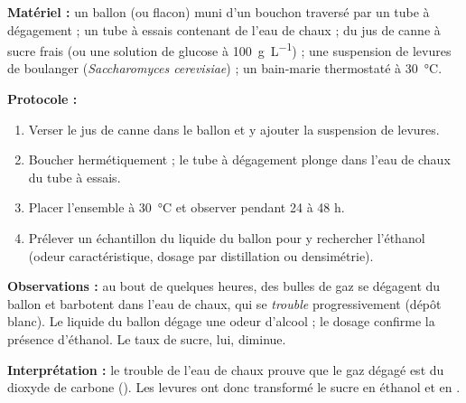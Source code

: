 \documentclass[11pt]{article}
\newcommand{\cle}[1]{{\popxbold\color{popdark}#1}}
\begin{document}
\begin{experience}
\textbf{Matériel :} un ballon (ou flacon) muni d'un bouchon traversé par un tube à dégagement ; un tube à essais contenant de l'eau de chaux ; du jus de canne à sucre frais (ou une solution de glucose à \SI{100}{\gram\per\liter}) ; une suspension de levures de boulanger (\emph{Saccharomyces cerevisiae}) ; un bain-marie thermostaté à \SI{30}{\celsius}.

\textbf{Protocole :}
\begin{enumerate}
\item Verser le jus de canne dans le ballon et y ajouter la suspension de levures.
\item Boucher hermétiquement ; le tube à dégagement plonge dans l'eau de chaux du tube à essais.
\item Placer l'ensemble à \SI{30}{\celsius} et observer pendant 24 à 48 h.
\item Prélever un échantillon du liquide du ballon pour y rechercher l'éthanol (odeur caractéristique, dosage par distillation ou densimétrie).
\end{enumerate}

\textbf{Observations :} au bout de quelques heures, des bulles de gaz se dégagent du ballon et barbotent dans l'eau de chaux, qui se \emph{trouble} progressivement (dépôt blanc). Le liquide du ballon dégage une odeur d'alcool ; le dosage confirme la présence d'éthanol. Le taux de sucre, lui, diminue.

\textbf{Interprétation :} le trouble de l'eau de chaux prouve que le gaz dégagé est du \cle{dioxyde de carbone} (). Les levures ont donc transformé le sucre en éthanol et en .
\end{experience}
\end{document}

